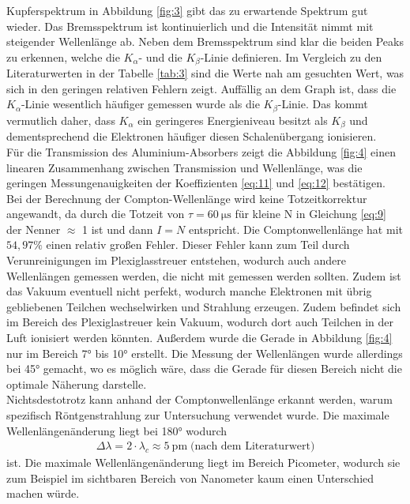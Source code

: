 \justifying Kupferspektrum in Abbildung \ref{fig:3} gibt das zu erwartende Spektrum gut
wieder. Das Bremsspektrum ist kontinuierlich und die Intensität nimmt mit steigender Wellenlänge ab.
Neben dem Bremsspektrum sind klar die beiden Peaks zu erkennen, welche die $K_{\alpha} $-
und die $K_{\beta} $-Linie definieren. Im Vergleich zu den Literaturwerten in der Tabelle \ref{tab:3}
sind die Werte nah am gesuchten Wert, was sich in den geringen relativen Fehlern zeigt.
Auffällig an dem Graph ist, dass die $K_{\alpha} $-Linie wesentlich häufiger gemessen wurde
als die $K_{\beta}$-Linie. Das kommt vermutlich daher, dass $K_{\alpha} $ ein
geringeres Energieniveau besitzt als $K_{\beta} $ und dementsprechend die 
Elektronen häufiger diesen Schalenübergang ionisieren.\\
Für die Transmission des Aluminium-Absorbers zeigt die Abbildung
\ref{fig:4} einen linearen Zusammenhang zwischen Transmission und Wellenlänge,
was die geringen Messungenauigkeiten der Koeffizienten \eqref{eq:11} und \eqref{eq:12}
bestätigen.
Bei der Berechnung der Compton-Wellenlänge wird keine Totzeitkorrektur angewandt,
da durch die Totzeit von $\tau = \SI{60}{\micro\second} $ für kleine N in 
Gleichung \eqref{eq:9} der Nenner $\approx$ 1 ist und dann $I=N$ entspricht.
Die Comptonwellenlänge hat mit $54,97\%$ einen relativ großen Fehler. Dieser Fehler
kann zum Teil  durch Verunreinigungen im Plexiglasstreuer entstehen, wodurch auch andere 
Wellenlängen gemessen werden, die nicht mit gemessen werden sollten.
Zudem ist das Vakuum eventuell nicht perfekt, wodurch manche Elektronen mit
übrig gebliebenen Teilchen wechselwirken und Strahlung erzeugen. Zudem befindet sich im 
Bereich des Plexiglastreuer kein Vakuum, wodurch dort auch Teilchen in der Luft
ionisiert werden könnten. Außerdem wurde die Gerade in Abbildung \ref{fig:4} nur im
Bereich 7° bis 10° erstellt. Die Messung der Wellenlängen wurde allerdings
bei 45° gemacht, wo es möglich wäre, dass die Gerade für diesen Bereich nicht
die optimale Näherung darstelle. \\
Nichtsdestotrotz kann anhand der Comptonwellenlänge erkannt werden, warum spezifisch 
Röntgenstrahlung zur Untersuchung verwendet wurde. Die maximale Wellenlängenänderung
liegt bei 180° wodurch 
\begin{align}
    \Delta \lambda = 2 \cdot \lambda _c \approx \SI{5}{\pico\meter} \;\text{(nach dem Literaturwert)}
\end{align}
ist. Die maximale Wellenlängenänderung liegt im Bereich Picometer, wodurch sie zum Beispiel im sichtbaren Bereich von Nanometer
kaum einen Unterschied machen würde.




\newpage
\printbibliography

